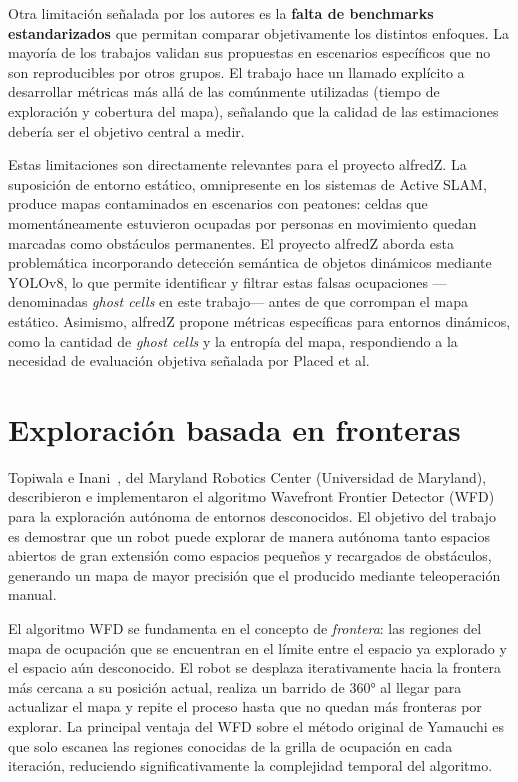 Otra limitación señalada por los autores es la \textbf{falta de benchmarks
estandarizados} que permitan comparar objetivamente los distintos enfoques.
La mayoría de los trabajos validan sus propuestas en escenarios específicos
que no son reproducibles por otros grupos. El trabajo hace un llamado
explícito a desarrollar métricas más allá de las comúnmente utilizadas
(tiempo de exploración y cobertura del mapa), señalando que la calidad de
las estimaciones debería ser el objetivo central a medir.

Estas limitaciones son directamente relevantes para el proyecto alfredZ. La
suposición de entorno estático, omnipresente en los sistemas de Active SLAM,
produce mapas contaminados en escenarios con peatones: celdas que
momentáneamente estuvieron ocupadas por personas en movimiento quedan
marcadas como obstáculos permanentes. El proyecto alfredZ aborda esta
problemática incorporando detección semántica de objetos dinámicos
mediante YOLOv8, lo
que permite identificar y filtrar estas falsas ocupaciones ---denominadas
\textit{ghost cells} en este trabajo--- antes de que corrompan el mapa
estático. Asimismo, alfredZ propone métricas específicas para entornos
dinámicos, como la cantidad de \textit{ghost cells} y la entropía del mapa,
respondiendo a la necesidad de evaluación objetiva señalada por Placed
et al.

\section{Exploración basada en fronteras}

Topiwala e Inani~\cite{topiwala2018frontier}, del Maryland Robotics Center
(Universidad de Maryland), describieron e implementaron el algoritmo
Wavefront Frontier Detector (WFD) para la exploración autónoma de entornos
desconocidos. El objetivo del trabajo es demostrar que un robot puede
explorar de manera autónoma tanto espacios abiertos de gran extensión como
espacios pequeños y recargados de obstáculos, generando un mapa de mayor
precisión que el producido mediante teleoperación manual.

El algoritmo WFD se fundamenta en el concepto de \textit{frontera}: las
regiones del mapa de ocupación que se encuentran en el límite entre el
espacio ya explorado y el espacio aún desconocido. El robot se desplaza
iterativamente hacia la frontera más cercana a su posición actual, realiza
un barrido de 360° al llegar para actualizar el mapa y repite el proceso
hasta que no quedan más fronteras por explorar. La principal ventaja del
WFD sobre el método original de Yamauchi es que solo escanea las regiones
conocidas de la grilla de ocupación en cada iteración, reduciendo
significativamente la complejidad temporal del algoritmo.

